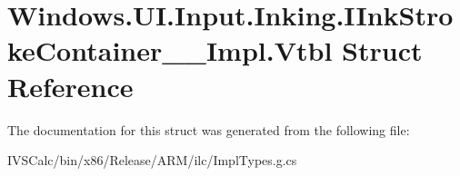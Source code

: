\hypertarget{struct_windows_1_1_u_i_1_1_input_1_1_inking_1_1_i_ink_stroke_container_____impl_1_1_vtbl}{}\section{Windows.\+U\+I.\+Input.\+Inking.\+I\+Ink\+Stroke\+Container\+\_\+\+\_\+\+Impl.\+Vtbl Struct Reference}
\label{struct_windows_1_1_u_i_1_1_input_1_1_inking_1_1_i_ink_stroke_container_____impl_1_1_vtbl}


The documentation for this struct was generated from the following file\+:\begin{DoxyCompactItemize}
\item 
I\+V\+S\+Calc/bin/x86/\+Release/\+A\+R\+M/ilc/Impl\+Types.\+g.\+cs\end{DoxyCompactItemize}
